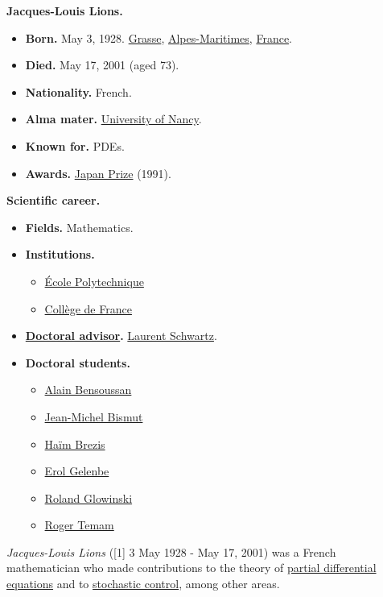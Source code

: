 \documentclass{book}
\numberwithin{equation}{section}
\begin{document}
\textbf{Jacques-Louis Lions.}
\begin{itemize}
    \item \textbf{Born.} May 3, 1928. \href{https://en.wikipedia.org/wiki/Grasse}{Grasse}, \href{https://en.wikipedia.org/wiki/Alpes-Maritimes}{Alpes-Maritimes}, \href{https://en.wikipedia.org/wiki/France}{France}.
    \item \textbf{Died.} May 17, 2001 (aged 73).
    \item \textbf{Nationality.} French.
    \item \textbf{Alma mater.} \href{https://en.wikipedia.org/wiki/University_of_Nancy}{University of Nancy}.
    \item \textbf{Known for.} PDEs.
    \item \textbf{Awards.} \href{https://en.wikipedia.org/wiki/Japan_Prize}{Japan Prize} (1991).
\end{itemize}
\textbf{Scientific career.}
\begin{itemize}
    \item \textbf{Fields.} Mathematics.
    \item \textbf{Institutions.}
    \begin{itemize}
        \item \href{https://en.wikipedia.org/wiki/%C3%89cole_Polytechnique}{\'Ecole Polytechnique}
        \item \href{https://en.wikipedia.org/wiki/Coll%C3%A8ge_de_France}{Coll\`ege de France}
    \end{itemize}
    \item \textbf{\href{https://en.wikipedia.org/wiki/Doctoral_advisor}{Doctoral advisor}.} \href{https://en.wikipedia.org/wiki/Laurent_Schwartz}{Laurent Schwartz}.
    \item \textbf{Doctoral students.}
    \begin{itemize}
        \item \href{https://en.wikipedia.org/wiki/Alain_Bensoussan}{Alain Bensoussan}
        \item \href{https://en.wikipedia.org/wiki/Jean-Michel_Bismut}{Jean-Michel Bismut}
        \item \href{https://en.wikipedia.org/wiki/Ha%C3%AFm_Brezis}{Ha\"im Brezis}
        \item \href{https://en.wikipedia.org/wiki/Erol_Gelenbe}{Erol Gelenbe}
        \item \href{https://en.wikipedia.org/wiki/Roland_Glowinski}{Roland Glowinski}
        \item \href{https://en.wikipedia.org/wiki/Roger_Temam}{Roger Temam}
    \end{itemize}
\end{itemize}
\textit{Jacques-Louis Lions} ([1] 3 May 1928 - May 17, 2001) was a French mathematician who made contributions to the theory of \href{https://en.wikipedia.org/wiki/Partial_differential_equation}{partial differential equations} and to \href{https://en.wikipedia.org/wiki/Stochastic_processes}{stochastic control}, among other areas.
\end{document}
